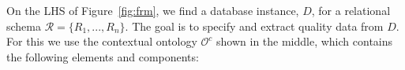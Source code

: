 \documentclass[format=acmsmall, review=false, screen=true]{acmart}
\newlength\Origarrayrulewidth
\newcommand{\ttline}[1]{%
  \noalign{\global\setlength\Origarrayrulewidth{\arrayrulewidth}}%
  \noalign{\global\setlength\arrayrulewidth{1.5pt}}\cline{#1}%
  \noalign{\global\setlength\arrayrulewidth{\Origarrayrulewidth}}%
}
\newcommand\ltcell[1]{%
  \multicolumn{1}{!{\vrule width 1.5pt}c!{\vrule width 1pt}}{#1}%
}
\newcommand\rtcell[1]{%
  \multicolumn{1}{!{\vrule width 1pt}c!{\vrule width 1.5pt}}{#1}%
}
\newcommand{\boxtheorem}{\ensuremath{\hfill \Box}}
\newcommand{\mc}[1]{\mathcal{ #1}}
\newcommand{\nit}[1]{{\it #1}}
\newcommand{\rred}[1]{#1}
\newcommand{\schema}{\mc{R}}
\newcounter{rownum}
\newcommand{\omd}{OMD}
\newcommand{\red}[1]{{#1}}
\begin{document}
\begin{comment}
{\tiny \addtocounter{rownum}{1}\arabic{rownum}} & \ltcell{$H_2$} & \rtcell{Sep/5/2016} & Anna \\
\ttline{2-3}\cline{4-4}
{\tiny \addtocounter{rownum}{1}\arabic{rownum}} & \ltcell{$H_1$} & \rtcell{Mar/9/2016} & Helen \\
\ttline{2-3}\cline{4-4}
{\tiny \addtocounter{rownum}{1}\arabic{rownum}} & \ltcell{$H_1$} & \rtcell{Jan/6/2016} & Alan \\
\ttline{2-3}\cline{4-4}
{\tiny \addtocounter{rownum}{1}\arabic{rownum}} & \ltcell{$H_1$} & \rtcell{Mar/6/2016} & Sara \\
\ttline{2-3}\cline{4-4}
\end{tabular}
\end{center}
\end{minipage}
\end{table}

In the \omd \ model, there could be semantic constraints, represented as {\em dimensional constraints}. For example, a constraint that states {\em ``No nurse in intensive care unit \rred{during} January"}\red{. It} is satisfied \red{by table {\it WorkSchedules} (Figure~\ref{fig:omdm})} since none of the tuples shows a working schedule during January. Another example is a constraint saying {\em ``No nurse has working schedules in more than one institution on the same day"}, which is \red{also} satisfied by {\it WorkSchedules}.

According to the clean data in $\nit{Temperatures}^q$, the second tuple provides the answer to the query. \boxtheorem\\

+++\\
\end{comment}

 On the LHS of Figure~\ref{fig:frm}, we find a database instance, $D$, for a relational schema $\schema=\{R_1,...,R_n\}$. The goal is to specify and extract quality data from $D$. For this we use
the contextual ontology $\mc{O}^c$ shown in the middle, which contains the following elements and components:
\end{document}
